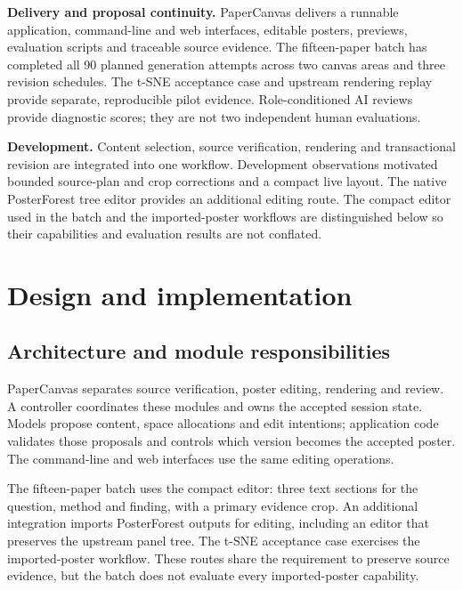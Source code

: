 \documentclass{article}
\begin{document}
\textbf{Delivery and proposal continuity.} PaperCanvas delivers a runnable application, command-line and web interfaces, editable posters, previews, evaluation scripts and traceable source evidence. The fifteen-paper batch has completed all 90 planned generation attempts across two canvas areas and three revision schedules. The t-SNE acceptance case and upstream rendering replay provide separate, reproducible pilot evidence. Role-conditioned AI reviews provide diagnostic scores; they are not two independent human evaluations.

\textbf{Development.} Content selection, source verification, rendering and transactional revision are integrated into one workflow. Development observations motivated bounded source-plan and crop corrections and a compact live layout. The native PosterForest tree editor provides an additional editing route. The compact editor used in the batch and the imported-poster workflows are distinguished below so their capabilities and evaluation results are not conflated.

\section{Design and implementation}
\label{sec:design}

\subsection{Architecture and module responsibilities}
PaperCanvas separates source verification, poster editing, rendering and review. A controller coordinates these modules and owns the accepted session state. Models propose content, space allocations and edit intentions; application code validates those proposals and controls which version becomes the accepted poster. The command-line and web interfaces use the same editing operations.

The fifteen-paper batch uses the compact editor: three text sections for the question, method and finding, with a primary evidence crop. An additional integration imports PosterForest outputs for editing, including an editor that preserves the upstream panel tree. The t-SNE acceptance case exercises the imported-poster workflow. These routes share the requirement to preserve source evidence, but the batch does not evaluate every imported-poster capability.
\end{document}
